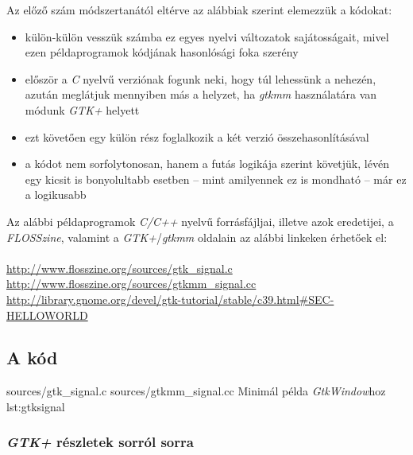 Az előző szám módszertanától eltérve az alábbiak szerint elemezzük a kódokat:

\begin{itemize}
 \item külön-külön vesszük számba ez egyes nyelvi változatok sajátosságait, mivel ezen példaprogramok kódjának hasonlósági foka szerény
 \item először a \textit{C} nyelvű verziónak fogunk neki, hogy túl lehessünk a nehezén, azután meglátjuk mennyiben más a helyzet, ha \textit{gtkmm} használatára van módunk \textit{GTK+} helyett
 \item ezt követően egy külön rész foglalkozik a két verzió összehasonlításával
 \item a kódot nem sorfolytonosan, hanem a futás logikája szerint követjük, lévén egy kicsit is bonyolultabb esetben -- mint amilyennek ez is mondható -- már ez a logikusabb
\end{itemize}

Az alábbi példaprogramok \textit{C/C++} nyelvű forrásfájljai, illetve azok eredetijei, a \textit{FLOSSzine}, valamint a \textit{GTK+}/\textit{gtkmm} oldalain az alábbi linkeken érhetőek el:
\ \\\\
\url{http://www.flosszine.org/sources/gtk_signal.c}\\
\url{http://www.flosszine.org/sources/gtkmm_signal.cc}\\
\url{http://library.gnome.org/devel/gtk-tutorial/stable/c39.html#SEC-HELLOWORLD}\\

\subsection{A kód}

\lstinputsources
{sources/gtk_signal.c}
{sources/gtkmm_signal.cc}
{Minimál példa \textit{GtkWindow}hoz}
{lst:gtksignal}

\subsubsection{\textit{GTK+} részletek sorról sorra}

